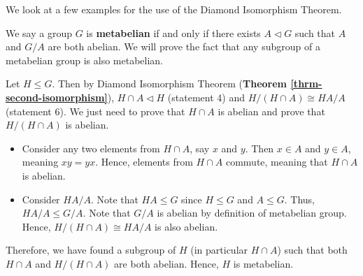 We look at a few examples for the use of the Diamond Isomorphism Theorem.
\begin{example}
    We say a group $G$ is \textbf{metabelian} if and only if there exists $A \lhd G$ such that $A$ and $G/A$ are both abelian. We will prove the fact that any subgroup of a metabelian group is also metabelian.

    Let $H \leq G$. Then by Diamond Isomorphism Theorem (\textbf{Theorem \ref{thrm-second-isomorphism}}), $H \cap A \lhd H$ (statement 4) and $H/(H \cap A) \cong HA / A$ (statement 6). We just need to prove that $H \cap A$ is abelian and prove that $H/(H \cap A)$ is abelian.
    \begin{itemize}
        \item Consider any two elements from $H \cap A$, say $x$ and $y$. Then $x \in A$ and $y \in A$, meaning $xy = yx$. Hence, elements from $H \cap A$ commute, meaning that $H \cap A$ is abelian.
        \item Consider $HA / A$. Note that $HA \leq G$ since $H \leq G$ and $A \leq G$. Thus, $HA / A \leq G / A$. Note that $G/A$ is abelian by definition of metabelian group. Hence, $H/(H \cap A) \cong HA / A$ is also abelian.
    \end{itemize}
    Therefore, we have found a subgroup of $H$ (in particular $H \cap A$) such that both $H \cap A$ and $H/(H\cap A)$ are both abelian. Hence, $H$ is metabelian.
\end{example}

